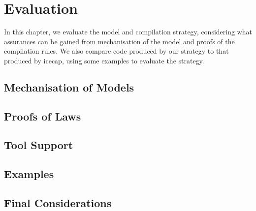 \chapter{Evaluation}
\label{evaluation-chapter}

In this chapter, we evaluate the model and compilation strategy,
considering what assurances can be gained from mechanisation of the
model and proofs of the compilation rules.
We also compare code produced by our strategy to that produced by icecap,
using some examples to evaluate the strategy.

\section{Mechanisation of Models}


\section{Proofs of Laws}


\section{Tool Support}


\section{Examples}


\section{Final Considerations}
